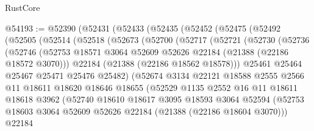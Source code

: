 \begin{lexlean}{RustCore}
\begin{coremodule}
@54193 := @52390
    (@52431
      (@52433
        (@52435
          (@52452
            (@52475
              (@52492
                (@52505
                  (@52514
                    (@52518
                      (@52673
                        (@52700
                          (@52717
                            (@52721
                              (@52730
                                (@52736
                                  (@52746
                                    (@52753
                                      @18571
                                      @3064
                                      @52609
                                      @52626
                                      @22184
                                      (@21388 (@22186 @18572 @3070)))
                                    @22184
                                    (@21388 (@22186 @18562 @18578)))
                                  @25461
                                  @25464
                                  @25467
                                  @25471
                                  @25476
                                  @25482)
                                (@52674
                                  @3134
                                  @22121
                                  @18588
                                  @2555
                                  @2566
                                  @11
                                  @18611
                                  @18620
                                  @18646
                                  @18655
                                  (@52529
                                    @1135
                                    @2552
                                    @16
                                    @11
                                    @18611
                                    @18618
                                    @3962
                                    (@52740
                                      @18610
                                      @18617
                                      @3095
                                      @18593
                                      @3064
                                      @52594
                                      (@52753
                                        @18603
                                        @3064
                                        @52609
                                        @52626
                                        @22184
                                        (@21388 (@22186 @18604 @3070)))
                                      @22184

\end{coremodule}
\end{lexlean}
